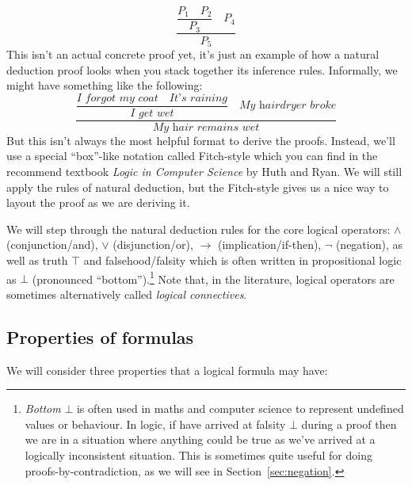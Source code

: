 \begin{equation*}
\dfrac{\dfrac{P_1 \quad P_2}{P_3} \quad P_4}{P_5}
\end{equation*}
%
This isn't an actual concrete proof yet, it's just an example of how
a natural deduction proof looks when you stack together
its inference rules. Informally, we might have something like the
following:
%
\begin{equation*}
\dfrac{\dfrac{\textit{I forgot my coat} \quad \textit{It's
      raining}}{\textit{I get wet}} \quad \textit{My hairdryer broke}}
       {\textit{My hair remains wet}}
\end{equation*}
%
But this isn't always the most helpful format to derive the
proofs. Instead, we'll use a special ``box''-like notation called
Fitch-style which you can find in the recommend textbook
\emph{Logic in Computer Science} by Huth and Ryan.
We will still apply the rules of natural deduction, but the Fitch-style
gives us a nice way to layout the proof as we are deriving it.

We will step through the natural deduction rules for the core logical
operators: $\wedge$ (conjunction/and), $\vee$ (disjunction/or),
$\rightarrow$ (implication/if-then), $\neg$ (negation), as well as
truth $\top$ and falsehood/falsity which is often written in
propositional logic as $\bot$ (pronounced
``bottom'').\footnote{\emph{Bottom} $\bot$ is often used in maths and
  computer science to represent undefined values or behaviour. In
  logic, if have arrived at falsity $\bot$ during a proof then we are
  in a situation where anything could be true as we've arrived at a
  logically inconsistent situation. This is sometimes quite useful for
  doing proofs-by-contradiction, as we will see in
  Section~\ref{sec:negation}.} Note that, in the literature, logical operators
  are sometimes alternatively called \emph{logical connectives}.

\subsection{Properties of formulas}

We will consider three properties that a logical formula may have:

